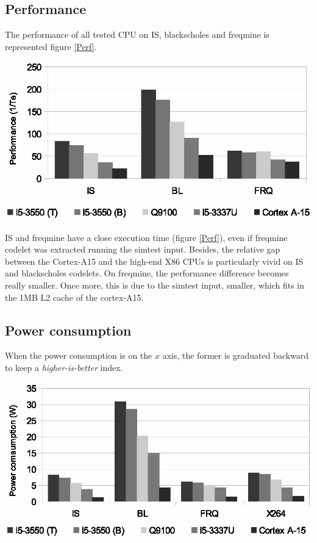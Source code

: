 \documentclass{article}
\newenvironment{Figure}
  {\par\medskip\noindent\center\minipage{0.9\linewidth}}
  {\endminipage\par\bigskip\medskip}
\begin{document}
\begin{multicols}{2}
\subsection{Performance}
The performance of all tested CPU on IS, blackscholes and freqmine is represented figure \ref{Perf}.

\begin{Figure}
\centering
\includegraphics[width=\linewidth]{Performance.eps}
\end{Figure}


IS and freqmine have a close execution time (figure \ref{Perf}), even if freqmine codelet was extracted running the simtest input. Besides, the relative gap between the Cortex-A15 and the high-end X86 CPUs is particularly vivid on IS and blackscholes codelets. On freqmine, the performance difference becomes really smaller. Once more, this is due to the simtest input, smaller, which fits in the 1MB L2 cache of the cortex-A15.


\subsection{Power consumption}
When the power consumption is on the $x$ axis, the former is graduated backward to keep a \textit{higher-is-better} index.


\begin{Figure}
\centering
\includegraphics[width=\linewidth]{Power_consumption.eps}
\end{Figure}


\end{multicols}
\end{document}
